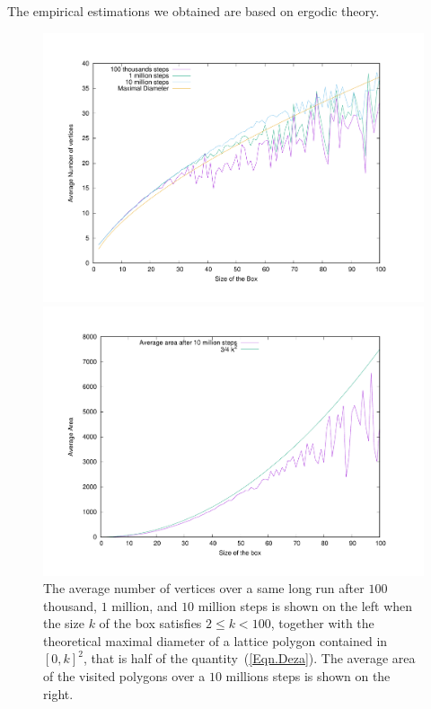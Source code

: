 \documentclass[a4paper]{article}
\begin{document}
The empirical estimations we obtained are based on ergodic theory.
\noindent
\begin{figure}[b!]
  \begin{center}
    \begin{minipage}[c]{.49\linewidth}
      \includegraphics[scale=.25]{averageVertices}
    \end{minipage}
    \begin{minipage}[c]{.49\linewidth}
      \includegraphics[scale=.25]{averageVolume10M}
    \end{minipage}
    \caption{The average number of vertices over a same long run after $100$ thousand, $1$ million, and $10$ million steps is shown on the left when the size $k$ of the box satisfies $2\leq k<100$, together with the theoretical maximal diameter of a lattice polygon contained in $[0,k]^2$, that is half of the quantity~(\ref{Eqn.Deza}). The average area of the visited polygons over a $10$ millions steps is shown on the right.
    \label{Fig.NV}}
  \end{center}
\end{figure}
\end{document}
